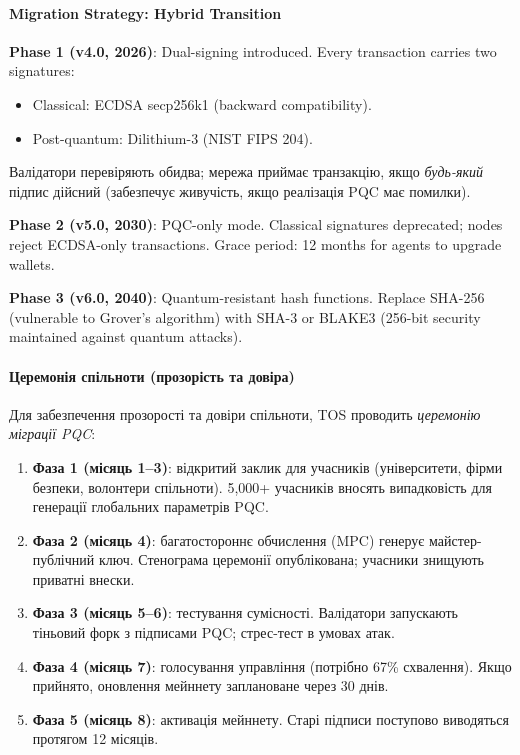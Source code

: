 \documentclass[11pt]{article}
\begin{document}
\paragraph{Migration Strategy: Hybrid Transition}
\textbf{Phase 1 (v4.0, 2026)}: Dual-signing introduced. Every transaction carries two signatures:
\begin{itemize}[noitemsep]
  \item Classical: ECDSA secp256k1 (backward compatibility).
  \item Post-quantum: Dilithium-3 (NIST FIPS 204).
\end{itemize}
Валідатори перевіряють обидва; мережа приймає транзакцію, якщо \emph{будь-який} підпис дійсний (забезпечує живучість, якщо реалізація PQC має помилки).

\textbf{Phase 2 (v5.0, 2030)}: PQC-only mode. Classical signatures deprecated; nodes reject ECDSA-only transactions. Grace period: 12 months for agents to upgrade wallets.

\textbf{Phase 3 (v6.0, 2040)}: Quantum-resistant hash functions. Replace SHA-256 (vulnerable to Grover's algorithm) with SHA-3 or BLAKE3 (256-bit security maintained against quantum attacks).

\paragraph{Церемонія спільноти (прозорість та довіра)}
Для забезпечення прозорості та довіри спільноти, TOS проводить \emph{церемонію міграції PQC}:
\begin{enumerate}[noitemsep]
  \item \textbf{Фаза 1 (місяць 1--3)}: відкритий заклик для учасників (університети, фірми безпеки, волонтери спільноти). 5,000+ учасників вносять випадковість для генерації глобальних параметрів PQC.
  \item \textbf{Фаза 2 (місяць 4)}: багатостороннє обчислення (MPC) генерує майстер-публічний ключ. Стенограма церемонії опублікована; учасники знищують приватні внески.
  \item \textbf{Фаза 3 (місяць 5--6)}: тестування сумісності. Валідатори запускають тіньовий форк з підписами PQC; стрес-тест в умовах атак.
  \item \textbf{Фаза 4 (місяць 7)}: голосування управління (потрібно 67\% схвалення). Якщо прийнято, оновлення мейннету заплановане через 30 днів.
  \item \textbf{Фаза 5 (місяць 8)}: активація мейннету. Старі підписи поступово виводяться протягом 12 місяців.
\end{enumerate}
\end{document}
